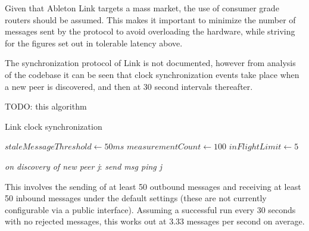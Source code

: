\documentclass[11pt]{article} %
\theoremstyle{plain}
\theoremstyle{definition}
\begin{document}
Given that Ableton Link targets a mass market, the use of consumer grade
routers should be assumed. This makes it important to minimize the number of
messages sent by the protocol to avoid overloading the hardware, while striving
for the figures set out in tolerable latency above.

The synchronization protocol of Link is not documented, however from analysis
of the codebase it can be seen that clock synchronization events take place
when a new peer is discovered, and then at 30 second intervals thereafter.

TODO: this algorithm

\begin{algorithm}
  \caption{Link clock synchronization}\label{linktiming}
  \begin{algorithmic}[2]

    \State $staleMessageThreshold \gets \textit{50ms}$
    \State $measurementCount \gets \textit{100}$
    \State $inFlightLimit \gets \textit{5}$

      \BState \emph{on discovery of new peer j}:
      \BState \textit{send msg ping j}
    \EndProcedure
  \end{algorithmic}
\end{algorithm}
%
%

%
%

This involves the sending of at least 50 outbound messages and receiving at
least 50 inbound messages under the default settings (these are not
currently configurable via a public interface). Assuming a successful run every
30 seconds with no rejected messages, this works out at 3.33 messages per
second on average.
\end{document}
